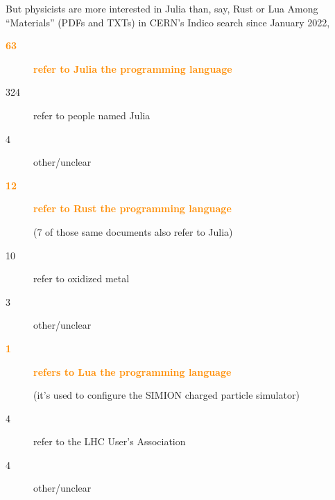 \documentclass[aspectratio=169]{beamer}
\begin{document}


\begin{frame}{But physicists are more interested in Julia than, say, Rust or Lua}
\vspace{0.5 cm}
Among ``Materials'' (PDFs and TXTs) in CERN's Indico search since January 2022,

\vspace{0.25 cm}
\begin{description}
\item[\textcolor{darkorange}{\bf 63}] \textcolor{darkorange}{\bf refer to Julia the programming language}
\item[324] refer to people named Julia
\item[4] other/unclear
\end{description}

\begin{description}
\item[\textcolor{darkorange}{\bf 12}] \textcolor{darkorange}{\bf refer to Rust the programming language}

(7 of those same documents also refer to Julia)
\item[10] refer to oxidized metal
\item[3] other/unclear
\end{description}

\begin{description}
\item[\textcolor{darkorange}{\bf 1}] \textcolor{darkorange}{\bf refers to Lua the programming language}

(it's used to configure the SIMION charged particle simulator)
\item[4] refer to the LHC User's Association
\item[4] other/unclear
\end{description}
\end{frame}



\end{document}
